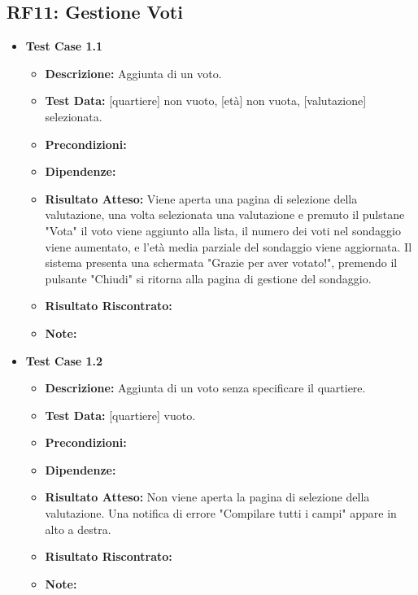     \subsection{RF11: Gestione Voti}
        \begin{itemize}
            \item \textbf{Test Case 1.1}
                \begin{itemize}
                    \item \textbf{Descrizione:} Aggiunta di un voto.
                    \item \textbf{Test Data:} [quartiere] non vuoto, [età] non vuota, [valutazione] selezionata. 
                    \item \textbf{Precondizioni:}
                    \item \textbf{Dipendenze:}
                    \item \textbf{Risultato Atteso:} Viene aperta una pagina di selezione della valutazione, una volta selezionata una valutazione e premuto il pulstane "Vota" il voto viene aggiunto alla lista, il numero dei voti nel sondaggio viene aumentato, e l'età media parziale del sondaggio viene aggiornata. Il sistema presenta una schermata "Grazie per aver votato!", premendo il pulsante "Chiudi" si ritorna alla pagina di gestione del sondaggio.
                    \item \textbf{Risultato Riscontrato:}
                    \item \textbf{Note:}
                \end{itemize}
            \item \textbf{Test Case 1.2}
                \begin{itemize}
                    \item \textbf{Descrizione:} Aggiunta di un voto senza specificare il quartiere.
                    \item \textbf{Test Data:} [quartiere] vuoto.
                    \item \textbf{Precondizioni:}
                    \item \textbf{Dipendenze:}
                    \item \textbf{Risultato Atteso:} Non viene aperta la pagina di selezione della valutazione. Una notifica di errore "Compilare tutti i campi" appare in alto a destra.
                    \item \textbf{Risultato Riscontrato:}
                    \item \textbf{Note:}
                \end{itemize}

\end{itemize}
